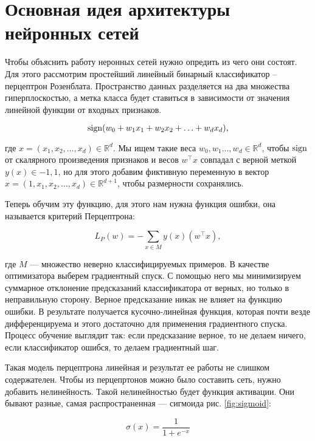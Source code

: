 \section{Основная идея архитектуры нейронных сетей}

Чтобы объяснить работу неронных сетей нужно опредить из чего они состоят. Для этого рассмотрим простейший линейный бинарный классификатор -- перцептрон Розенблата. Пространство данных разделяется на два множества гиперплоскостью, а метка класса будет ставиться в зависимости от значения линейной функции от входных признаков.

\begin{equation}
 \operatorname*{sign} (w_0 + w_1x_1 + w_2x_2 + \ldots + w_dx_d),
\end{equation}

где $x =(x_1, x_2, \ldots, x_d) \in \mathds{R}^d$. Мы ищем такие веса $w_0, w_1 \ldots, w_d \in \mathds{R}^d$, чтобы $\operatorname*{sign}$ от скалярного произведения признаков и весов $w^\top x$ совпадал с верной меткой $y(x) \in {-1,1}$, но для этого добавим фиктивную переменную в вектор $x =(1, x_1, x_2, \ldots, x_d) \in \mathds{R}^{d+1}$, чтобы размерности сохранялись.

\bigskip
Теперь обучим эту функцию, для этого нам нужна функция ошибки, она называется критерий Перцептрона:

\begin{equation}
 L_P(w) = - \sum_{x \in M} y(x)(w^\top x),
\end{equation}

где $M$ --- множество неверно классифицируемых примеров. В качестве оптимизатора выберем градиентный спуск. С помощью него мы минимизируем суммарное отклонение предсказаний классификатора от верных, но только в неправильную сторону. Верное предсказание никак не влияет на функцию ошибки. В результате получается кусочно-линейная функция, которая почти везде дифференцируема и этого достаточно для применения градиентного спуска. Процесс обучение выглядит так: если предсказание верное, то не делаем ничего, если классификатор ошибся, то делаем градиентный шаг.

Такая модель перцептрона линейная и результат ее работы не слишком содержателен. Чтобы из перцепртонов можно было составить сеть, нужно добавить нелинейность. Такой нелинейностью будет функция активации. Они бывают разные, самая распространенная --- сигмоида рис. \ref{fig:sigmoid}:

\begin{equation} \label{eq:sigma}
    \sigma (x) = \frac{1}{1+e^{-x}}
\end{equation}


